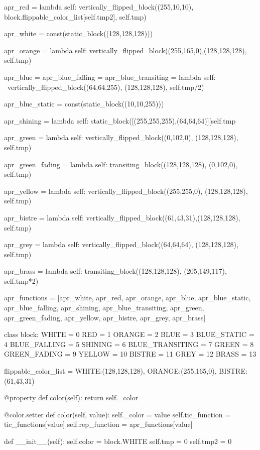 \documentclass[UTF8]{article}
\begin{document}
\begin{python}
apr_red = lambda self: vertically_flipped_block((255,10,10), block.flippable_color_list[self.tmp2], self.tmp)

apr_white = const(static_block((128,128,128)))

apr_orange = lambda self: vertically_flipped_block((255,165,0),(128,128,128), self.tmp)

apr_blue = apr_blue_falling = apr_blue_transiting = lambda self: \
    vertically_flipped_block((64,64,255), (128,128,128), self.tmp/2)

apr_blue_static = const(static_block((10,10,255)))

apr_shining = lambda self: static_block([(255,255,255),(64,64,64)][self.tmp%

apr_green = lambda self: vertically_flipped_block((0,102,0), (128,128,128), self.tmp)

apr_green_fading = lambda self: transiting_block((128,128,128), (0,102,0), self.tmp)

apr_yellow = lambda self: vertically_flipped_block((255,255,0), (128,128,128), self.tmp)

apr_bistre = lambda self: vertically_flipped_block((61,43,31),(128,128,128), self.tmp)

apr_grey = lambda self: vertically_flipped_block((64,64,64), (128,128,128), self.tmp)

apr_brass = lambda self: transiting_block((128,128,128), (205,149,117), self.tmp*2)

apr_functions = [apr_white, apr_red, apr_orange, apr_blue, apr_blue_static,
                 apr_blue_falling, apr_shining, apr_blue_transiting, apr_green,
                 apr_green_fading, apr_yellow, apr_bistre, apr_grey, apr_brass]


class block:
    WHITE = 0
    RED = 1
    ORANGE = 2
    BLUE = 3
    BLUE_STATIC = 4
    BLUE_FALLING = 5
    SHINING = 6
    BLUE_TRANSITING = 7
    GREEN = 8
    GREEN_FADING = 9
    YELLOW = 10
    BISTRE = 11
    GREY = 12
    BRASS = 13
    
    flippable_color_list = {WHITE:(128,128,128), ORANGE:(255,165,0), BISTRE:(61,43,31)}
    
    @property
    def color(self):
        return self._color
    
    @color.setter
    def color(self, value):
        self._color = value
        self.tic_function = tic_functions[value]
        self.rep_function = apr_functions[value]
    
    def __init__(self):
        self.color = block.WHITE
        self.tmp   = 0
        self.tmp2  = 0
        

\end{python}
\end{document}
